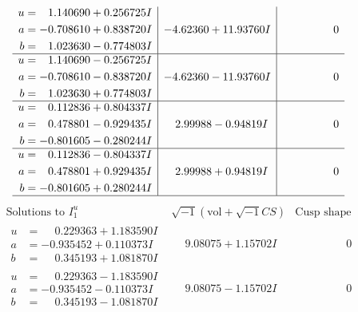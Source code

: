 \documentclass[1p]{elsarticle_modified}
\theoremstyle{definition}
\newcommand{\I}{\sqrt{-1}}
\begin{document}
$$\begin{array}{c|c|c}
\begin{aligned}
u &= \phantom{-}1.140690 + 0.256725 I \\
a &= -0.708610 + 0.838720 I \\
b &= \phantom{-}1.023630 - 0.774803 I\end{aligned}
 & -4.62360 + 11.93760 I & \phantom{-0.000000 } 0 \\ \hline\begin{aligned}
u &= \phantom{-}1.140690 - 0.256725 I \\
a &= -0.708610 - 0.838720 I \\
b &= \phantom{-}1.023630 + 0.774803 I\end{aligned}
 & -4.62360 - 11.93760 I & \phantom{-0.000000 } 0 \\ \hline\begin{aligned}
u &= \phantom{-}0.112836 + 0.804337 I \\
a &= \phantom{-}0.478801 - 0.929435 I \\
b &= -0.801605 - 0.280244 I\end{aligned}
 & \phantom{-}2.99988 - 0.94819 I & \phantom{-0.000000 } 0 \\ \hline\begin{aligned}
u &= \phantom{-}0.112836 - 0.804337 I \\
a &= \phantom{-}0.478801 + 0.929435 I \\
b &= -0.801605 + 0.280244 I\end{aligned}
 & \phantom{-}2.99988 + 0.94819 I & \phantom{-0.000000 } 0\\
 \hline 
 \end{array}$$\newpage$$\begin{array}{c|c|c}  
\text{Solutions to }I^u_{1}& \I (\text{vol} + \sqrt{-1}CS) & \text{Cusp shape}\\
 \hline 
\begin{aligned}
u &= \phantom{-}0.229363 + 1.183590 I \\
a &= -0.935452 + 0.110373 I \\
b &= \phantom{-}0.345193 + 1.081870 I\end{aligned}
 & \phantom{-}9.08075 + 1.15702 I & \phantom{-0.000000 } 0 \\ \hline\begin{aligned}
u &= \phantom{-}0.229363 - 1.183590 I \\
a &= -0.935452 - 0.110373 I \\
b &= \phantom{-}0.345193 - 1.081870 I\end{aligned}
 & \phantom{-}9.08075 - 1.15702 I & \phantom{-0.000000 } 0 \\ \hline\begin{aligned}

\end{aligned}
\end{array}$$
\end{document}
